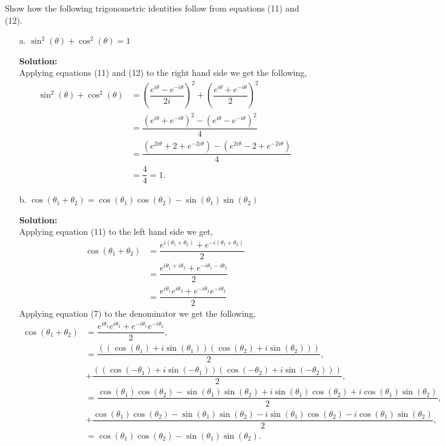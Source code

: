 \documentclass[12pt]{article}
\makeatletter
\theoremstyle{homework}
\newenvironment{exercise}[1]
{\def\@currentlabel{#1}\exercisecore}
{\endexercisecore}
\newcommand{\localhead}[1]{\par\smallskip\noindent\textbf{#1}\nobreak\\}%
\newcommand\solution{\localhead{Solution:}}
\makeatother
\begin{document}
\begin{exercise}{13} Show how the following trigonometric identities follow from equations (11) and (12).\\
    \begin{enumerate}
        \item[a.] $\sin^2(\theta) + \cos^2(\theta) = 1$\\
        \solution Applying equations (11) and (12) to the right hand side we get the following,
        \begin{align*}
            \sin^2(\theta) + \cos^2(\theta) &= \left(\dfrac{e^{i\theta} - e^{-i\theta}}{2i}\right)^2 + \left(\dfrac{e^{i\theta} + e^{-i\theta}}{2}\right)^2\\
             &= \dfrac{(e^{i\theta} + e^{-i\theta})^2 - (e^{i\theta} - e^{-i\theta})^2}{4}\\
             &= \dfrac{(e^{2i\theta}+2+e^{-2i\theta}) - (e^{2i\theta}-2+e^{-2i\theta})}{4}\\
             &= \dfrac{4}{4} = 1.
        \end{align*} 
        \item[b.] $\cos(\theta_1 + \theta_2) = \cos(\theta_1)\cos(\theta_2) - \sin(\theta_1)\sin(\theta_2)$\\ 
        \solution Applying equation (11) to the left hand side we get, 
        \begin{align*}
            \cos(\theta_1 + \theta_2) &= \dfrac{e^{i(\theta_1 + \theta_2)} + e^{-i(\theta_1 + \theta_2)}}{2}\\
            &=\dfrac{e^{i\theta_1 + i\theta_2} + e^{-i\theta_1 - i\theta_2}}{2}\\
            &=\dfrac{e^{i\theta_1}e^{i\theta_2} + e^{-i\theta_1} e^{-i\theta_2}}{2}
        \end{align*}
        Applying equation (7) to the denominator we get the following, 
        \begin{align*}
            \cos(\theta_1 + \theta_2) &= \dfrac{e^{i\theta_1}e^{i\theta_2} + e^{-i\theta_1} e^{-i\theta_2}}{2},\\
            &=\dfrac{((\cos(\theta_1) + i\sin(\theta_1))(\cos(\theta_2) + i\sin(\theta_2)))}{2},\\ 
            &+ \dfrac{((\cos(-\theta_1) + i\sin(-\theta_1))(\cos(-\theta_2) + i\sin(-\theta_2)))}{2},\\
            &= \dfrac{\cos(\theta_1)\cos(\theta_2) - \sin(\theta_1)\sin(\theta_2) + i\sin(\theta_1)\cos(\theta_2) + i\cos(\theta_1)\sin(\theta_2)}{2},\\
            &+ \dfrac{\cos(\theta_1)\cos(\theta_2) - \sin(\theta_1)\sin(\theta_2) - i\sin(\theta_1)\cos(\theta_2) - i\cos(\theta_1)\sin(\theta_2)}{2},\\
            &=  \cos(\theta_1)\cos(\theta_2) - \sin(\theta_1)\sin(\theta_2).
        \end{align*}
    \end{enumerate}
\end{exercise}
\vspace{.5in}
\end{document}
